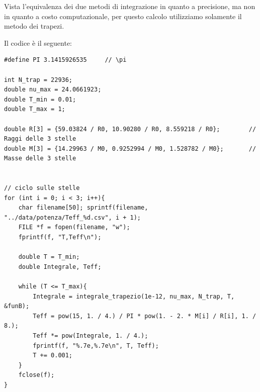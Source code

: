 \documentclass[a4paper, titlepage]{article}
\begin{document}
Vista l'equivalenza dei due metodi di integrazione in quanto a precisione, ma non in quanto a costo computazionale, per questo calcolo utilizziamo solamente il metodo dei trapezi.

Il codice è il seguente:

\begin{lstlisting}
#define PI 3.1415926535     // \pi

int N_trap = 22936;
double nu_max = 24.0661923;
double T_min = 0.01;
double T_max = 1;

double R[3] = {59.03824 / R0, 10.90280 / R0, 8.559218 / R0};        // Raggi delle 3 stelle
double M[3] = {14.29963 / M0, 0.9252994 / M0, 1.528782 / M0};       // Masse delle 3 stelle


// ciclo sulle stelle
for (int i = 0; i < 3; i++){
    char filename[50]; sprintf(filename, "../data/potenza/Teff_%d.csv", i + 1);
    FILE *f = fopen(filename, "w");
    fprintf(f, "T,Teff\n");

    double T = T_min;
    double Integrale, Teff;

    while (T <= T_max){
        Integrale = integrale_trapezio(1e-12, nu_max, N_trap, T, &funB);
        Teff = pow(15, 1. / 4.) / PI * pow(1. - 2. * M[i] / R[i], 1. / 8.);
        Teff *= pow(Integrale, 1. / 4.);
        fprintf(f, "%.7e,%.7e\n", T, Teff);
        T += 0.001;
    }
    fclose(f);
}
\end{lstlisting}
\end{document}

